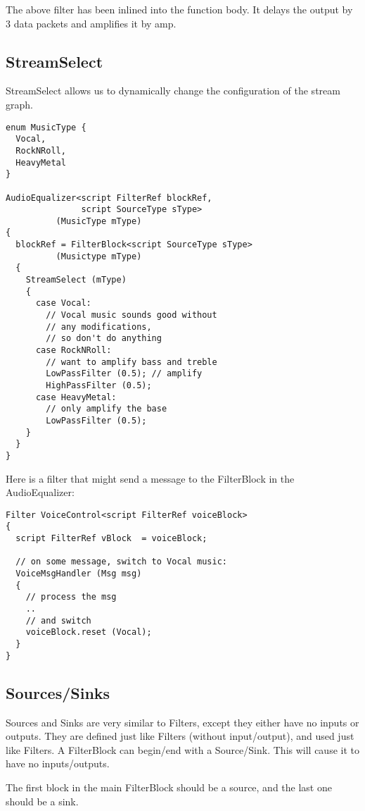 \documentclass[draft]{article}
\begin{document}
The above filter has been inlined into the function body.  It delays
the output by 3 data packets and amplifies it by amp.

\subsection{StreamSelect}

StreamSelect allows us to dynamically change the configuration
of the stream graph.  

\begin{verbatim}
enum MusicType {
  Vocal,
  RockNRoll,
  HeavyMetal
}

AudioEqualizer<script FilterRef blockRef,
               script SourceType sType>
          (MusicType mType)
{
  blockRef = FilterBlock<script SourceType sType>
          (Musictype mType)
  {
    StreamSelect (mType)
    {
      case Vocal:
        // Vocal music sounds good without 
        // any modifications,
        // so don't do anything
      case RockNRoll:
        // want to amplify bass and treble
        LowPassFilter (0.5); // amplify
        HighPassFilter (0.5);
      case HeavyMetal:
        // only amplify the base
        LowPassFilter (0.5);
    }
  }
}
\end{verbatim}

Here is a filter that might send a message to the FilterBlock in 
the AudioEqualizer:

\begin{verbatim}
Filter VoiceControl<script FilterRef voiceBlock>
{
  script FilterRef vBlock  = voiceBlock;

  // on some message, switch to Vocal music:
  VoiceMsgHandler (Msg msg)
  {
    // process the msg
    ..
    // and switch
    voiceBlock.reset (Vocal);
  }
}
\end{verbatim}

\subsection{Sources/Sinks}

Sources and Sinks are very similar to Filters, except they either have
no inputs or outputs.  They are defined just like Filters (without
input/output), and used just like Filters.  A FilterBlock can
begin/end with a Source/Sink.  This will cause it to have no
inputs/outputs.

The first block in the main FilterBlock should be a source, and the
last one should be a sink.
\end{document}
